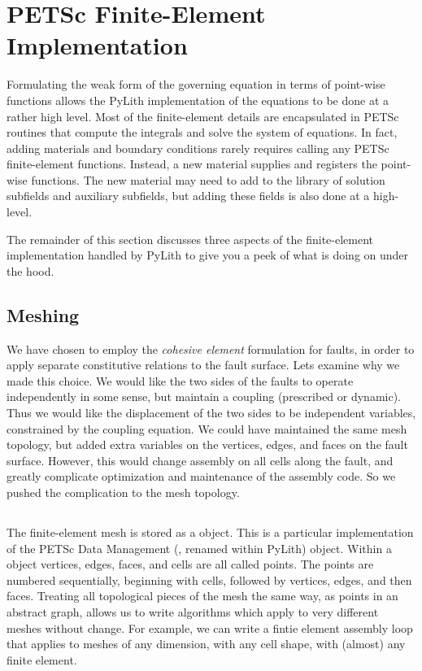 \section{PETSc Finite-Element Implementation}

Formulating the weak form of the governing equation in terms of
point-wise functions allows the PyLith implementation of the equations
to be done at a rather high level. Most of the finite-element details
are encapsulated in PETSc routines that compute the integrals and
solve the system of equations. In fact, adding materials and boundary
conditions rarely requires calling any PETSc finite-element
functions. Instead, a new material supplies and registers the
point-wise functions. The new material may need to add to the library
of solution subfields and auxiliary subfields, but adding these fields
is also done at a high-level.

The remainder of this section discusses three aspects of the
finite-element implementation handled by PyLith to give you a peek of
what is doing on under the hood.

\subsection{Meshing}

We have chosen to employ the \textit{cohesive element} formulation for
faults, in order to apply separate constitutive relations to the fault
surface. Lets examine why we made this choice. We would like the two
sides of the faults to operate independently in some sense, but
maintain a coupling (prescribed or dynamic). Thus we would like the
displacement of the two sides to be independent variables, constrained
by the coupling equation. We could have maintained the same mesh
topology, but added extra variables on the vertices, edges, and faces
on the fault surface. However, this would change assembly on all cells
along the fault, and greatly complicate optimization and maintenance
of the assembly code. So we pushed the complication to the mesh
topology.

\subsection{}

The finite-element mesh is stored as a  object. This is
a particular implementation of the PETSc Data Management (,
renamed  within PyLith) object. Within a
 object vertices, edges, faces, and cells are all
called points. The points are numbered sequentially, beginning with
cells, followed by vertices, edges, and then faces. Treating all
topological pieces of the mesh the same way, as points in an abstract
graph, allows us to write algorithms which apply to very different
meshes without change. For example, we can write a fintie element
assembly loop that applies to meshes of any dimension, with any cell
shape, with (almost) any finite element.

